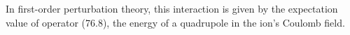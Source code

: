 In first-order perturbation theory, this interaction is given by the expectation value of operator (76.8), the energy of a quadrupole in the ion's Coulomb field.
